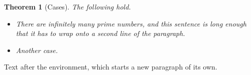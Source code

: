 \documentclass[11pt]{article}
\newtheorem{theorem}{Theorem}
\begin{document}
\begin{theorem}[Cases]
The following hold.
\begin{itemize}
\item There are infinitely many prime numbers, and this sentence is long enough that it has to wrap onto a second line of the paragraph.
\item Another case.
\end{itemize}
\end{theorem}
Text after the environment, which starts a new paragraph of its own.
\end{document}
